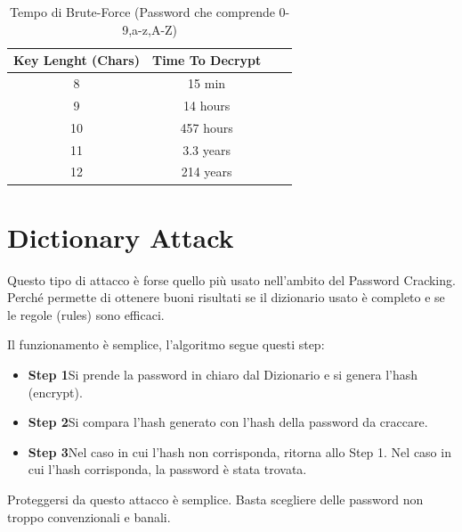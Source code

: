\begin{table}[h]
    \centering
    \begin{tabular}{ |c|c|c|c| }
        \hline
        Key Lenght (Chars) & Time To Decrypt \\
        \hline
        8                  & 15 min          \\
        \hline
        9                  & 14 hours        \\
        \hline
        10                 & 457 hours       \\
        \hline
        11                 & 3.3 years       \\
        \hline
        12                 & 214 years       \\
        \hline
    \end{tabular}
    \label{fig:brute}
    \caption{Tempo di Brute-Force (Password che comprende 0-9,a-z,A-Z)\cite{hashcrack}}
\end{table}

\section{Dictionary Attack}
Questo tipo di attacco \cite{Dictionary_attack} è forse quello più usato nell’ambito del Password Cracking. Perché permette di ottenere buoni risultati se il dizionario usato è completo e se le regole (rules) sono efficaci.

Il funzionamento è semplice, l’algoritmo segue questi step:
\begin{itemize}
    \item \textbf{Step 1}\newline Si prende la password in chiaro dal Dizionario e si genera l’hash (encrypt).
    \item \textbf{Step 2}\newline Si compara l’hash generato con l’hash della password da craccare.
    \item \textbf{Step 3}\newline Nel caso in cui l’hash non corrisponda, ritorna allo Step 1. \newline Nel caso in cui l’hash corrisponda, la password è stata trovata.
\end{itemize}

Proteggersi da questo attacco è semplice. Basta scegliere delle password non troppo convenzionali e banali.

